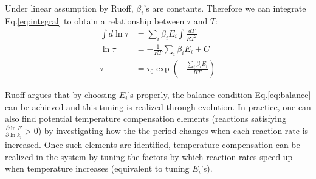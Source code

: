 \documentclass[a4paper,10pt]{article}
\numberwithin{equation}{section}
\begin{document}
Under linear assumption by Ruoff, $\beta_i$'s are constants. Therefore we can integrate Eq.\ref{eq:integral} to obtain a relationship between $\tau$ and $T$:
\begin{equation}
\begin{split}
\int d\ln \tau&=\sum_i \beta_i E_i \int \frac{dT}{RT^2}\\
\ln \tau &= -\frac{1}{RT}\sum_i \beta_i E_i +C\\
\tau &= \tau_0 \exp\left({-\frac{\sum_i \beta_i E_i}{RT}}\right)
\end{split}
\end{equation}

Ruoff argues that by choosing $E_i$'s properly, the balance condition Eq.\ref{eq:balance}   can be achieved and  this  tuning is realized through evolution. In practice, one can also find potential temperature compensation elements (reactions satisfying $\frac{\partial \ln  F}{\partial \ln k_i}>0$) by investigating how the the period changes when each reaction rate is increased. Once such elements are identified, temperature compensation can be realized in the system by tuning the factors by which reaction rates speed up when temperature increases (equivalent to tuning $E_i$'s).

\end{document}

